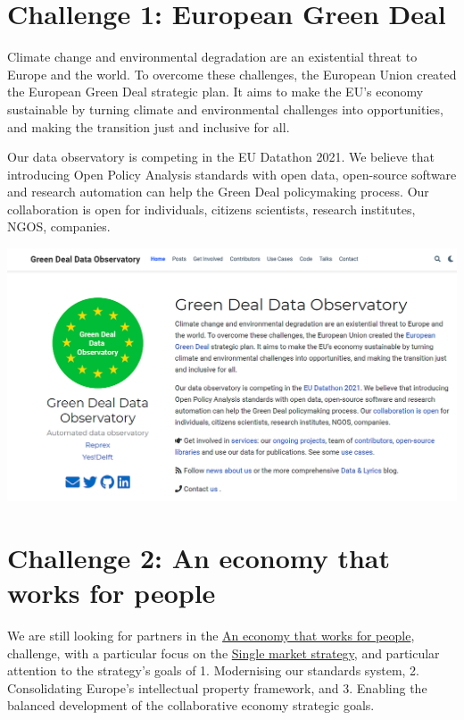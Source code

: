 \documentclass[
  a4paper,
  openany, a4paper, oneside]{book}
\begin{document}
\hypertarget{challenge-green-deal}{%
\section{Challenge 1: European Green Deal}\label{challenge-green-deal}}

Climate change and environmental degradation are an existential threat to Europe and the world. To overcome these challenges, the European Union created the European Green Deal strategic plan. It aims to make the EU's economy sustainable by turning climate and environmental challenges into opportunities, and making the transition just and inclusive for all.

Our data observatory is competing in the EU Datathon 2021. We believe that introducing Open Policy Analysis standards with open data, open-source software and research automation can help the Green Deal policymaking process. Our collaboration is open for individuals, citizens scientists, research institutes, NGOS, companies.

\begin{center}\includegraphics[width=0.8\linewidth]{plots/green_deal_observatory} \end{center}

\hypertarget{challenge-economy}{%
\section{Challenge 2: An economy that works for people}\label{challenge-economy}}

We are still looking for partners in the \href{https://ec.europa.eu/info/strategy/priorities-2019-2024/economy-works-people_en\#:~:text=Individuals\%20and\%20businesses\%20in\%20the,needs\%20of\%20the\%20EU's\%20citizens.}{An economy that works for people}, challenge, with a particular focus on the \href{https://ec.europa.eu/info/strategy/priorities-2019-2024/economy-works-people/internal-market_en}{Single market strategy}, and particular attention to the strategy's goals of 1. Modernising our standards system, 2. Consolidating Europe's intellectual property framework, and 3. Enabling the balanced development of the collaborative economy strategic goals.
\end{document}
